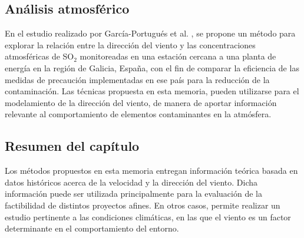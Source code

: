 \subsection{Análisis atmosférico}
En el estudio realizado por García-Portugués et al. \cite{Portugues12}, se propone un método para explorar la relación entre la dirección del viento y las concentraciones atmosféricas de SO$_2$ monitoreadas en una estación cercana a una planta de energía en la región de Galicia, España, con el fin de comparar la eficiencia de las medidas de precaución implementadas en ese país para la reducción de la contaminación. Las técnicas propuesta en esta memoria, pueden utilizarse para el modelamiento de la dirección del viento, de manera de 
aportar información relevante al comportamiento de elementos contaminantes en la atmósfera.

\subsection{Resumen del capítulo}
Los métodos propuestos en esta memoria entregan información teórica basada en datos históricos acerca de la velocidad y la dirección del viento. Dicha información puede ser utilizada principalmente para la evaluación de la factibilidad de distintos proyectos afines. En otros casos, permite realizar un estudio pertinente a las condiciones climáticas, en las que el viento es un factor determinante en el comportamiento del entorno.